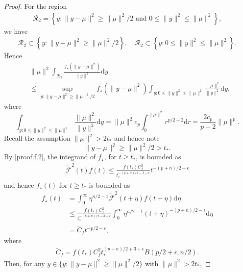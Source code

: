 \documentclass[preprint,11pt]{imsart}
\numberwithin{equation}{section}
\theoremstyle{plain}
\theoremstyle{definition}
\theoremstyle{remark}
\newcommand{\rd}{\mathrm{d}}
\begin{document}
\begin{proof}
 For the region
\begin{align*}
\mathcal{R}_2= \left\{y:\|y-\mu\|^2\geq \|\mu\|^2/2\text{ and }0\leq \|y\|^2\leq \|\mu\|^2\right\},
\end{align*}
 we have
\begin{align*}
 \mathcal{R}_2\subset\left\{y:\|y-\mu\|^2\geq \|\mu\|^2/2\right\}, \quad
\mathcal{R}_2\subset\left\{y:0\leq \|y\|^2\leq \|\mu\|^2\right\}.
\end{align*}
 Hence
\begin{equation}\label{eq:Rtwo.1}
 \begin{split}
&   \|\mu\|^2 \int_{\mathcal{R}_2}\frac{f_\star(\|y-\mu\|^2)}{\|y\|^2}\rd y \\
&\leq \sup_{y:\|y-\mu\|^2\geq \|\mu\|^2/2}f_\star(\|y-\mu\|^2)
  \int_{y:0\leq \|y\|^2\leq \|\mu\|^2}\frac{\|\mu\|^2}{\|y\|^2}\rd y, 
\end{split}
\end{equation}
 where
\begin{equation}\label{eq:Rtwo.2}
 \int_{y:0\leq \|y\|^2\leq \|\mu\|^2}\frac{\|\mu\|^2}{\|y\|^2}\rd y 
 = \|\mu\|^2 c_p \int_0^{\|\mu\|^2} r^{p/2-2}\rd r=\frac{2c_p}{p-2}\|\mu\|^p.
\end{equation} 
Recall the assumption $\|\mu\|^2>2t_*$ and
 hence note
 \begin{equation}\label{eq:region_R2}
  \|y-\mu\|^2\geq \|\mu\|^2/2 > t_*.
 \end{equation}
By \eqref{proof.f.2}, the integrand of $f_\star$, for $t\geq t_*$, is bounded as
\begin{align*}
 \tilde{\mathcal{F}}^2(t)f(t)
\leq \frac{f(t_*)C_f^2}{t_*^{-(p+n)/2-3-\epsilon}} t^{-(p+n)/2-\epsilon}
\end{align*}
 and hence $f_\star(t)$ for $t\geq t_*$ is bounded as
\begin{equation}\label{eq:int_f_star_R2} 
 \begin{split}
f_\star(t)&= \int_0^\infty \eta^{n/2-1}\tilde{\mathcal{F}}^2(t+\eta)f(t+\eta)\rd \eta \\
&\leq \frac{f(t_*)C_f^2}{t_*^{-(p+n)/2-3-\epsilon}}\int_0^\infty \eta^{n/2-1}(t+\eta)^{-(p+n)/2-\epsilon} \rd \eta \\
 &= \tilde{C}_f t^{-p/2-\epsilon},
\end{split}
\end{equation}
 where
 \begin{align*}
  \tilde{C}_f=f(t_*)C_f^2 t_*^{(p+n)/2+3+\epsilon}B(p/2+\epsilon,n/2).
 \end{align*}
 Then,  for any $y\in \{y:\|y-\mu\|^2\geq \|\mu\|^2/2\}$ with $\|\mu\|^2>2t_*$,

\end{proof}
\end{document}
